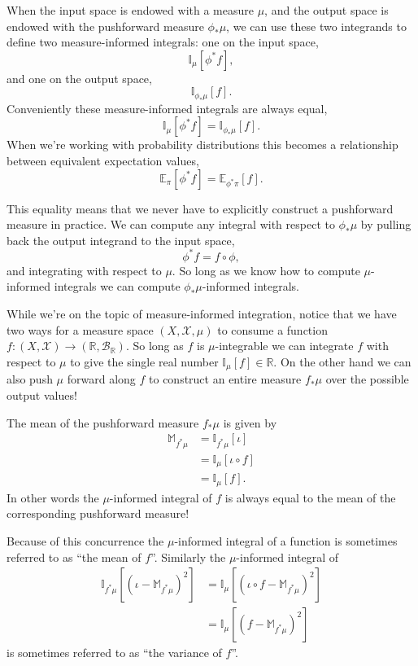 \documentclass[
  letterpaper,
  DIV=11,
  numbers=noendperiod]{scrartcl}
\begin{document}
When the input space is endowed with a measure \(\mu\), and the output
space is endowed with the pushforward measure \(\phi_{*} \mu\), we can
use these two integrands to define two measure-informed integrals: one
on the input space, \[
\mathbb{I}_{\mu} [ \phi^{*} f ],
\] and one on the output space, \[
\mathbb{I}_{\phi_{*} \mu} [ f ].
\] Conveniently these measure-informed integrals are always equal, \[
\mathbb{I}_{\mu} [ \phi^{*} f ] = \mathbb{I}_{\phi_{*} \mu} [ f ].
\] When we're working with probability distributions this becomes a
relationship between equivalent expectation values, \[
\mathbb{E}_{\pi} [ \phi^{*} f ]
=
\mathbb{E}_{\phi^{*} \pi} [ f ].
\]

This equality means that we never have to explicitly construct a
pushforward measure in practice. We can compute any integral with
respect to \(\phi_{*} \mu\) by pulling back the output integrand to the
input space, \[
\phi^{*} f = f \circ \phi,
\] and integrating with respect to \(\mu\). So long as we know how to
compute \(\mu\)-informed integrals we can compute
\(\phi_{*} \mu\)-informed integrals.

While we're on the topic of measure-informed integration, notice that we
have two ways for a measure space \((X, \mathcal{X}, \mu)\) to consume a
function
\(f : (X, \mathcal{X}) \rightarrow  (\mathbb{R}, \mathcal{B}_{\mathbb{R}})\).
So long as \(f\) is \(\mu\)-integrable we can integrate \(f\) with
respect to \(\mu\) to give the single real number
\(\mathbb{I}_{\mu}[f] \in \mathbb{R}\). On the other hand we can also
push \(\mu\) forward along \(f\) to construct an entire measure
\(f_{*} \mu\) over the possible output values!

The mean of the pushforward measure \(f_{*} \mu\) is given by
\begin{align*}
\mathbb{M}_{f^{*} \mu}
&=
\mathbb{I}_{f^{*} \mu} [ \iota ]
\\
&=
\mathbb{I}_{\mu} [ \iota \circ f ]
\\
&=
\mathbb{I}_{\mu} [ f ].
\end{align*} In other words the \(\mu\)-informed integral of \(f\) is
always equal to the mean of the corresponding pushforward measure!

Because of this concurrence the \(\mu\)-informed integral of a function
is sometimes referred to as ``the mean of \(f\)''. Similarly the
\(\mu\)-informed integral of \begin{align*}
\mathbb{I}_{f^{*} \mu} [ (\iota - \mathbb{M}_{f^{*} \mu})^{2} ]
&=
\mathbb{I}_{\mu} [ (\iota \circ f - \mathbb{M}_{f^{*} \mu})^{2} ]
\\
&=
\mathbb{I}_{\mu} [ (f - \mathbb{M}_{f^{*} \mu})^{2} ]
\end{align*} is sometimes referred to as ``the variance of \(f\)''.
\end{document}
